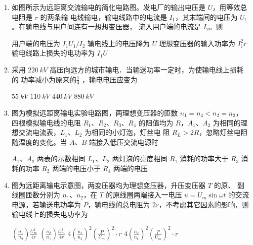 \begin{enumerate}
\item 
{}
如图所示为远距离交流输电的简化电路图。发电厂的输出电压是 $ U $，用等效总电阻是 $ r $ 的两条输
电线输电，输电线路中的电流是 $ I_{1} $，其末端间的电压为 $ U_{1} $。在输电线与用户间连有一想想变压器，
流入用户端的电流是 $ I_{2} $。则  
\begin{figure}[h!]
\centering

\end{figure}

\fourchoices
{用户端的电压为 $ I_{1} U_{1} / I_{2} $}
{输电线上的电压降为 $ U $}
{理想变压器的输入功率为 $ I_{1} ^{2} r $}
{输电线路上损失的电功率为 $ I_{1} U $}


\item 
{}
采用 $ 220 \ kV $ 高压向远方的城市输电．当输送功率一定时，为使输电线上损耗的
功率减小为原来的$ \frac{ 1 }{ 4 } $ ，输电电压应变为  


\fourchoices
{$ 55 \ kV $}
{$ 110 \ kV $}
{$ 440 \ kV $}
{$ 880 \ kV $}


\item 
{}
图为模拟远距离输电实验电路图，两理想变压器的匝数 $ n_{1} = n_{4} < n_{2} = n_{3} $，四根模拟输电线的电阻
$ R_{1} $、$ R_{2} $、$ R_{3} $、$ R_{4} $ 的阻值均为 $ R $，$ A_{1} $、$ A_{2} $ 为相同的理想交流电流表，$ L_{1} $、$ L_{2} $ 为相同的小灯泡，灯丝电
阻 $ R_{L} >2R $，忽略灯丝电阻随温度的变化。当 $ A $、$ B $
端接入低压交流电源时  
\begin{figure}[h!]
\centering

\end{figure}


\fourchoices
{$ A_{1} $、$ A_{2} $ 两表的示数相同}
{$ L_{1} $、$ L_{2} $ 两灯泡的亮度相同}
{$ R_{1} $ 消耗的功率大于 $ R_{3} $ 消耗的功率}
{$ R_{2} $ 两端的电压小于 $ R_{4} $ 两端的电压}



\item 
{}
图为远距离输电示意图，两变压器均为理想变压器，升压变压器 $ T $ 的原、
副线圈匝数分别为 $ n_{1} $、$ n_{2} $，在 $ T $ 的原线圈两端接入一电压 $ u= U_{m} \sin \omega t $ 的交流电源，若输送电功率为
$ P $，输电线的总电阻为 $ 2r $，不考虑其它因素的影响，则输电线上的损失电功率为  
\begin{figure}[h!]
\centering

\end{figure}



\fourchoices
{$\left(\frac{n_{1}}{n_{2}}\right) \frac{U_{m}^{2}}{4 r}$}
{$\left(\frac{n_{2}}{n_{1}}\right) \frac{U_{m}^{2}}{4 r}$}
{$4\left(\frac{n_{1}}{n_{2}}\right)^{2}\left(\frac{P}{U_{m}}\right)^{2} \cdot r$}
{$4\left(\frac{n_{2}}{n_{1}}\right)^{2}\left(\frac{P}{U_{m}}\right)^{2} \cdot r$}









\end{enumerate}

